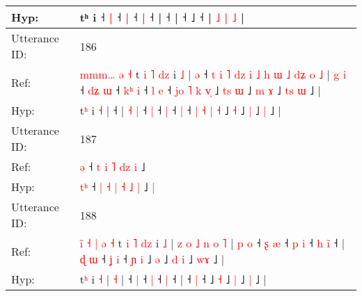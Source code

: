 \documentclass[10pt]{article}
\DeclareRobustCommand{\hl}[1]{{\textcolor{red}{#1}}}
\begin{document}
\begin{longtable}{ll}
 \\
Hyp: & \hl{}\hl{}\hl{}\hl{}\hl{}\hl{}\hl{}\hl{}\hl{}\hl{}\hl{}\hl{}\hl{}tʰ i ˧\hl{}\hl{} \hl{}\hl{|} ˧\hl{}\hl{} \hl{}\hl{|} ˧ \hl{|} ˧\hl{}\hl{}\hl{}\hl{}\hl{}\hl{}\hl{}\hl{}\hl{}\hl{}\hl{}\hl{}\hl{}\hl{}\hl{}\hl{}\hl{}\hl{}\hl{}\hl{}\hl{}\hl{}\hl{}\hl{}\hl{}\hl{} |\hl{}\hl{}\hl{}\hl{}\hl{}\hl{}\hl{}\hl{}\hl{}\hl{} ˧\hl{}\hl{}\hl{}\hl{}\hl{}\hl{} |\hl{}\hl{}\hl{}\hl{} ˧\hl{}\hl{}\hl{}\hl{} ˩\hl{}\hl{}\hl{}\hl{}\hl{}\hl{}\hl{} ˧ |\hl{}\hl{}\hl{}\hl{}\hl{}\hl{} \hl{˩} \hl{|} \hl{˩} |
 \\
\midrule
Utterance ID: & 186 \\
Ref: & \hl{m}\hl{m}\hl{m}\hl{…}\hl{ }\hl{ə}\hl{ }\hl{˧}\hl{ }t\hl{ }\hl{i}\hl{ }\hl{˥}\hl{ }\hl{d}\hl{z} i \hl{˩} |\hl{ }\hl{ə} ˧\hl{ }\hl{t}\hl{ }\hl{i}\hl{ }\hl{˥}\hl{ }\hl{d}\hl{z}\hl{ }\hl{i}\hl{ }\hl{˩}\hl{ }\hl{h}\hl{ }\hl{ɯ}\hl{ }\hl{˩}\hl{ }\hl{d}\hl{ʑ}\hl{ }\hl{o}\hl{ }\hl{˩} | \hl{g} \hl{i} ˧\hl{ }\hl{d}\hl{ʑ} \hl{ɯ} ˧\hl{ }\hl{k}\hl{ʰ} \hl{i} ˧\hl{ }\hl{l} \hl{e} ˧ \hl{j}\hl{o} \hl{˥} \hl{k} \hl{v}\hl{̩} ˩\hl{ }\hl{t}\hl{s} \hl{ɯ} ˩\hl{ }\hl{m} \hl{ɤ} ˩\hl{ }\hl{t}\hl{s} \hl{ɯ} ˩ |
 \\
Hyp: & \hl{}\hl{}\hl{}\hl{}\hl{}\hl{}\hl{}\hl{}\hl{}t\hl{}\hl{}\hl{}\hl{}\hl{}\hl{}\hl{ʰ} i \hl{˧} |\hl{}\hl{} ˧\hl{}\hl{}\hl{}\hl{}\hl{}\hl{}\hl{}\hl{}\hl{}\hl{}\hl{}\hl{}\hl{}\hl{}\hl{}\hl{}\hl{}\hl{}\hl{}\hl{}\hl{}\hl{}\hl{}\hl{}\hl{}\hl{} | \hl{˧} \hl{|} ˧\hl{}\hl{}\hl{} \hl{|} ˧\hl{}\hl{}\hl{} \hl{|} ˧\hl{}\hl{} \hl{|} ˧ \hl{}\hl{|} \hl{˧} \hl{|} \hl{}\hl{˧} ˩\hl{}\hl{}\hl{} \hl{˧} ˩\hl{}\hl{} \hl{|} ˩\hl{}\hl{}\hl{} \hl{|} ˩ |
 \\
\midrule
Utterance ID: & 187 \\
Ref: & \hl{}\hl{ə} ˧ \hl{t} \hl{i} \hl{˥} \hl{}\hl{d}\hl{z} \hl{i} ˩\hl{}\hl{}
 \\
Hyp: & \hl{t}\hl{ʰ} ˧ \hl{|} \hl{˧} \hl{|} \hl{˧}\hl{ }\hl{˩} \hl{|} ˩\hl{ }\hl{|}
 \\
\midrule
Utterance ID: & 188 \\
Ref: & \hl{i}\hl{̃}\hl{ }\hl{˧}\hl{ }\hl{|}\hl{ }\hl{ə}\hl{ }\hl{˧}\hl{ }t\hl{ }\hl{i}\hl{ }\hl{˥}\hl{ }\hl{d}\hl{z} i \hl{˩} |\hl{ }\hl{z}\hl{ }\hl{o}\hl{ }\hl{˩}\hl{ }\hl{n}\hl{ }\hl{o} \hl{˥} |\hl{ }\hl{p}\hl{ }\hl{o} ˧\hl{ }\hl{ʂ} \hl{æ} ˧\hl{ }\hl{p} \hl{i} ˧\hl{ }\hl{h} \hl{i}\hl{̃} ˧ |\hl{ }\hl{ɖ}\hl{ }\hl{ɯ} ˧\hl{ }\hl{ʝ} \hl{i} ˧\hl{ }\hl{ɲ}\hl{ }\hl{i} ˩ \hl{ə} ˩\hl{ }\hl{d} \hl{i} ˩ \hl{w}\hl{ɤ} ˩ |
 \\
Hyp: & \hl{}\hl{}\hl{}\hl{}\hl{}\hl{}\hl{}\hl{}\hl{}\hl{}\hl{}t\hl{}\hl{}\hl{}\hl{}\hl{}\hl{}\hl{ʰ} i \hl{˧} |\hl{}\hl{}\hl{}\hl{}\hl{}\hl{}\hl{}\hl{}\hl{}\hl{} \hl{˧} |\hl{}\hl{}\hl{}\hl{} ˧\hl{}\hl{} \hl{|} ˧\hl{}\hl{} \hl{|} ˧\hl{}\hl{} \hl{}\hl{|} ˧ |\hl{}\hl{}\hl{}\hl{} ˧\hl{}\hl{} \hl{|} ˧\hl{}\hl{}\hl{}\hl{} ˩ \hl{˧} ˩\hl{}\hl{} \hl{|} ˩ \hl{}\hl{|} ˩ |

\end{longtable}
\end{document}
